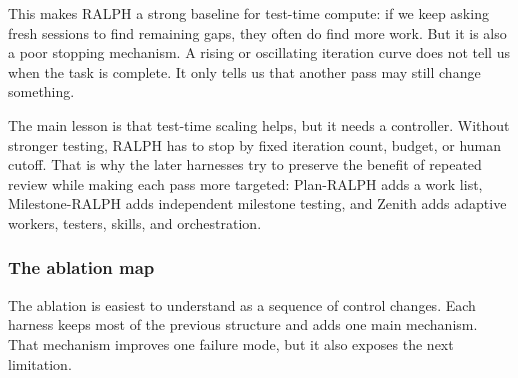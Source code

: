 \documentclass[11pt,a4paper]{article}
\begin{document}
This makes RALPH a strong baseline for test-time compute: if we keep asking fresh sessions to find remaining gaps, they often do find more work. But it is also a poor stopping mechanism. A rising or oscillating iteration curve does not tell us when the task is complete. It only tells us that another pass may still change something.

The main lesson is that test-time scaling helps, but it needs a controller. Without stronger testing, RALPH has to stop by fixed iteration count, budget, or human cutoff. That is why the later harnesses try to preserve the benefit of repeated review while making each pass more targeted: Plan-RALPH adds a work list, Milestone-RALPH adds independent milestone testing, and Zenith adds adaptive workers, testers, skills, and orchestration.

\subsubsection{The ablation map}

The ablation is easiest to understand as a sequence of control changes. Each harness keeps most of the previous structure and adds one main mechanism. That mechanism improves one failure mode, but it also exposes the next limitation.
\end{document}
